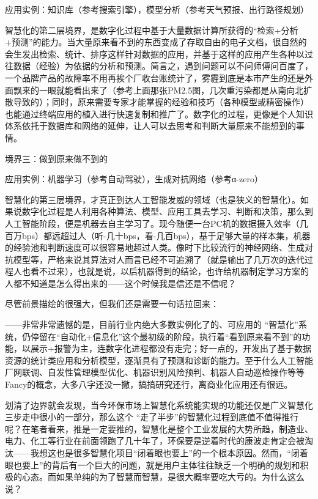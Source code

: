 \documentclass[]{book}
\begin{document}
应用实例：知识库（参考搜索引擎），模型分析（参考天气预报、出行路径规划）

智慧化的第二层境界，是数字化过程中基于大量数据计算所获得的``检索+分析+预测''的能力。当大量原来看不到的东西变成了存取自由的电子文档，很自然的会生发出检索、统计、排序这样针对数据的应用，并基于这样的应用产生各种以过往数据（经验）为依据的分析和预测。简言之，遇到问题可以不问师傅问百度了，一个品牌产品的故障率不用再挨个厂收台账统计了，雾霾到底是本市产生的还是外面飘来的一眼就能看出来了（参考上面那张PM2.5图，几次重污染都是从南向北扩散导致的）；同时，原来需要专家才能掌握的经验和技巧（各种模型或精密操作）也能通过终端应用的植入进行快速复制和推广了。数字化的过程，更像是个人知识体系依托于数据库和网络的延伸，让人可以去思考和判断大量原来不能想到的事情。

境界三：做到原来做不到的

应用实例：机器学习（参考自动驾驶），生成对抗网络（参考α-zero）

智慧化的第三层境界，才真正到达人工智能发威的领域（也是狭义的智慧化）。如果说数字化过程是人利用各种算法、模型、应用工具去学习、判断和决策，那么到人工智能阶段，便是机器去自主学习了。现今随便一台PC机的数据摄入效率（几百万bps）都远超过人（听-几十bps，看-几百bps），基于足够大量的样本集，机器的经验池和判断速度可以很容易地超过人类。像时下比较流行的神经网络、生成对抗模型等，严格来说其算法对人而言已经不可追溯了（就是输出了几万次的迭代过程人也看不过来），也就是说，以后机器得到的结论，也许给机器制定学习方案的人都不知道是怎么得出来的------这个时候我是信还是不信呢？

尽管前景描绘的很强大，但我们还是需要一句话拉回来：

------非常非常遗憾的是，目前行业内绝大多数实例化了的、可应用的 ``智慧化''系统，仍停留在``自动化+信息化''这个最初级的阶段，执行着``看到原来看不到''的功能，以展示+报警为主，连数字化进程都没有走完；好一点的，开发出了基于数据资源的统计类应用和分析模型，逐渐具有了预测和诊断的能力。至于什么人工智能厂网联调、自发性管理模型优化、机器识别风险预判、机器人自动巡检操作等等Fancy的概念，大多八字还没一撇，搞搞研究还行，离商业化应用还有很远。

划清了边界就会发现，当今环保市场上智慧化系统能实现的功能还仅是广义智慧化三步走中很小的一部分，那么这个 ``走了半步''的智慧化过程到底值不值得推行呢？在笔者看来，推是一定要推的，智慧化是整个工业发展的大势所趋，制造业、电力、化工等行业在前面领跑了几十年了，环保要是逆着时代的康波走肯定会被淘汰------我想这也是很多智慧化项目``闭着眼也要上''的一个根本原因。然而，``闭着眼也要上''的背后有一个巨大的问题，就是用户主体往往缺乏一个明确的规划和积极的心态。而如果单纯的为了智慧而智慧，是很大概率要吃大亏的。为什么这么说？
\end{document}
